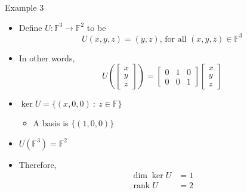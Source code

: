 \documentclass[usenames,dvipsnames,10pt]{beamer}
\newcommand\F{\mathbb{F}}
\newcommand\rank{\operatorname{rank}}
\begin{document}
\begin{frame}
  {Example 3}
  \begin{itemize}
  \item Define $U: \F^3 \rightarrow \F^2$ to be
    \[
      U(x,y,z) = (y,z)\text{, for all }(x,y,z) \in \F^3
    \]
  \item In other words,
    \[
      U\left(\begin{bmatrix} x \\ y \\ z\end{bmatrix}\right)
      =
      \begin{bmatrix} 0 &  1 & 0\\ 0 & 0 & 1 \end{bmatrix}\begin{bmatrix} x \\ y \\ z\end{bmatrix}
    \]
  \item $\ker U = \{ (x,0,0)\ :\ z\in \F\}$
    \begin{itemize}
    \item A basis is $\{ (1,0,0) \}$
    \end{itemize}
  \item $U(\F^3) = \F^2 $
  \item Therefore,
    \begin{align*}
      \dim \ker U &= 1\\
      \rank U &= 2
    \end{align*}
  \end{itemize}
\end{frame}
\end{document}
